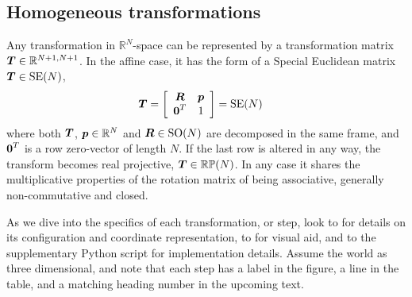 \subsection{Homogeneous transformations}

Any transformation in $\mathbb{R}^N$-space can be represented by a transformation matrix $\boldsymbol{T} \in \mathbb{R}^{N+1,N+1}$. In the affine case, it has the form of a Special Euclidean matrix $\boldsymbol{T}\in\mathrm{SE}(N)$,
%
\begin{align}
\dvec{T} &= 
\left[\begin{array}{c c}
 \mat{R}  & \dvec{p} \\%
 \dvec{0}^T  &  1
\end{array}\right] = \mathrm{SE}(N)\label{eq_homogeneous_affine_transform}
\end{align}
%
where both $\boldsymbol{T}$, $\boldsymbol{p}\in\mathbb{R}^N$ and $\boldsymbol{R}\in\mathrm{SO}(N)$ are decomposed in the same frame, and $\boldsymbol{0}^T$ is a row zero-vector of length $N$. If the last row is altered in any way, the transform becomes real projective, $\boldsymbol{T}\in\mathbb{RP}(N)$. In any case it shares the multiplicative properties of the rotation matrix of being associative, generally non-commutative and closed. %

As we dive into the specifics of each transformation, or step, look to  for details on its configuration and coordinate representation, to  for visual aid, and to the supplementary Python script for implementation details. Assume the world as three dimensional, and note that each step has a label in the figure, a line in the table, and a matching heading number in the upcoming text.



